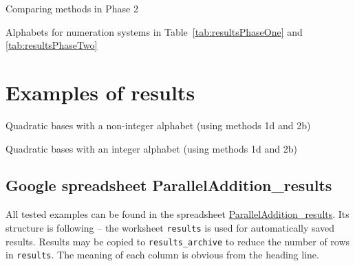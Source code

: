 \begin{landscape}
	\begin{table}[h]
		\begin{center}
		
		\end{center}
	\caption{Comparing methods in Phase 2}
	\label{tab:resultsPhaseTwo}
	\end{table}
\end{landscape}

\begin{table}[h]
	\begin{center}
	
	\end{center}
\caption{Alphabets for numeration systems in Table~\ref{tab:resultsPhaseOne} and \ref{tab:resultsPhaseTwo}}
\label{tab:alphabets}
\end{table}

\section{Examples of results}
\label{sec:resultsExamples}


\begin{table}[h]
	\begin{center}
	
	\end{center}
\caption{Quadratic bases with a non-integer alphabet (using methods 1d and 2b)}
\label{tab:resultsQuadrNonint}
\end{table}

 
\begin{table}[h]
	\begin{center}
	
	\end{center}
\caption{Quadratic bases with an integer alphabet (using methods 1d and 2b)}
\label{tab:resultsQuadrInt}
\end{table}


\subsection*{Google spreadsheet ParallelAddition\_results}
All tested examples can be found in the spreadsheet \href{https://docs.google.com/spreadsheets/d/1TnhrHdefHfHa0WSeVs4q6XVj3epjPlPlnoekE0E1xeM/edit?usp=sharing}{ParallelAddition\_results}. Its structure is following -- the worksheet \verb+results+ is used for automatically saved results. Results may be copied to \verb+results_archive+ to reduce the number of rows in \verb+results+. The meaning of each column is obvious from the heading line. 

